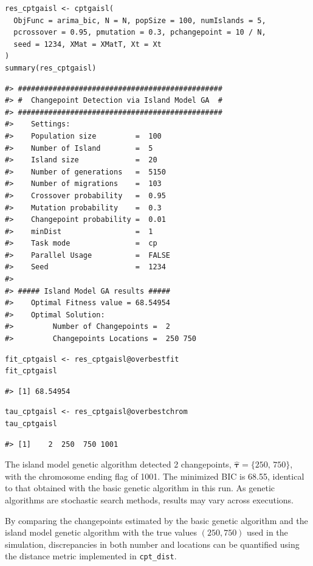 \begin{verbatim}
res_cptgaisl <- cptgaisl(
  ObjFunc = arima_bic, N = N, popSize = 100, numIslands = 5,
  pcrossover = 0.95, pmutation = 0.3, pchangepoint = 10 / N,
  seed = 1234, XMat = XMatT, Xt = Xt
)
summary(res_cptgaisl)
\end{verbatim}

\begin{verbatim}
#> ###############################################
#> #  Changepoint Detection via Island Model GA  #
#> ###############################################
#>    Settings: 
#>    Population size         =  100 
#>    Number of Island        =  5 
#>    Island size             =  20 
#>    Number of generations   =  5150 
#>    Number of migrations    =  103 
#>    Crossover probability   =  0.95 
#>    Mutation probability    =  0.3 
#>    Changepoint probability =  0.01 
#>    minDist                 =  1 
#>    Task mode               =  cp 
#>    Parallel Usage          =  FALSE 
#>    Seed                    =  1234 
#> 
#> ##### Island Model GA results ##### 
#>    Optimal Fitness value = 68.54954 
#>    Optimal Solution: 
#>         Number of Changepoints =  2 
#>         Changepoints Locations =  250 750
\end{verbatim}

\begin{verbatim}
fit_cptgaisl <- res_cptgaisl@overbestfit
fit_cptgaisl
\end{verbatim}

\begin{verbatim}
#> [1] 68.54954
\end{verbatim}

\begin{verbatim}
tau_cptgaisl <- res_cptgaisl@overbestchrom
tau_cptgaisl
\end{verbatim}

\begin{verbatim}
#> [1]    2  250  750 1001
\end{verbatim}

The island model genetic algorithm detected 2 changepoints, \(\hat{\boldsymbol{\tau}} = \{\text{250, 750}\}\), with the chromosome ending flag of 1001. The minimized BIC is 68.55, identical to that obtained with the basic genetic algorithm in this run. As genetic algorithms are stochastic search methods, results may vary across executions.

By comparing the changepoints estimated by the basic genetic algorithm and the island model genetic algorithm with the true values \((250, 750)\) used in the simulation, discrepancies in both number and locations can be quantified using the distance metric implemented in \texttt{cpt\_dist}.

